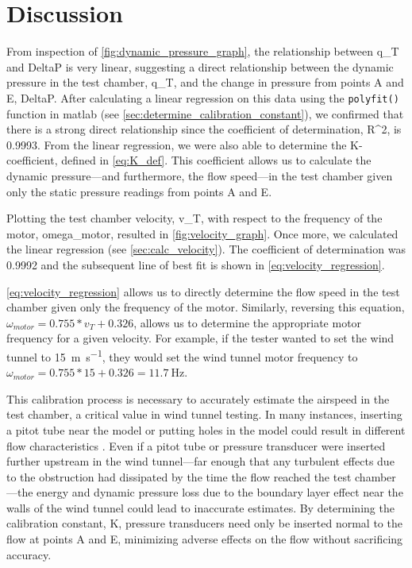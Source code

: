 \chapter{Discussion} 
\label{cp:discussion}
From inspection of \autoref{fig:dynamic_pressure_graph}, the relationship between \gls{q_T} and \gls{DeltaP} is very linear, suggesting a direct relationship between the dynamic pressure in the test chamber, \gls{q_T}, and the change in pressure from points A and E, \gls{DeltaP}. After calculating a linear regression on this data using the \verb|polyfit()| function in \acrshort{matlab} (see \autoref{sec:determine_calibration_constant}), we confirmed that there is a strong direct relationship since the coefficient of determination, \gls{R^2}, is \num{0.9993}. From the linear regression, we were also able to determine the \gls{K}-coefficient, defined in \autoref{eq:K_def}. This coefficient allows us to calculate the dynamic pressure—and furthermore, the flow speed—in the test chamber given only the static pressure readings from points A and E.

Plotting the test chamber velocity, \gls{v_T}, with respect to the frequency of the motor, \gls{omega_motor}, resulted in \autoref{fig:velocity_graph}. Once more, we calculated the linear regression (see \autoref{sec:calc_velocity}). The coefficient of determination was \num{0.9992} and the subsequent line of best fit is shown in \autoref{eq:velocity_regression}.

\autoref{eq:velocity_regression} allows us to directly determine the flow speed in the test chamber given only the frequency of the motor. Similarly, reversing this equation, 
$\omega_{motor} = 0.755 * v_T + 0.326$, allows us to determine the appropriate motor frequency for a given velocity. For example, if the tester wanted to set the wind tunnel to \qty{15}{\meter\per\second}, they would set the wind tunnel motor frequency to $\omega_{motor} = 0.755 * 15 + 0.326 = \qty{11.7}{\hertz}$.

This calibration process is necessary to accurately estimate the airspeed in the test chamber, a critical value in wind tunnel testing. In many instances, inserting a pitot tube near the model or putting holes in the model could result in different flow characteristics \citep{lecture4-notes}. Even if a pitot tube or pressure transducer were inserted further upstream in the wind tunnel—far enough that any turbulent effects due to the obstruction had dissipated by the time the flow reached the test chamber—the energy and dynamic pressure loss due to the boundary layer effect near the walls of the wind tunnel could lead to inaccurate estimates. By determining the calibration constant, \gls{K}, pressure transducers need only be inserted normal to the flow at points A and E, minimizing adverse effects on the flow without sacrificing accuracy.

